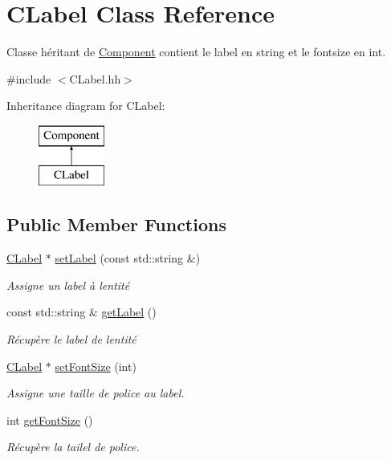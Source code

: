 \hypertarget{class_c_label}{}\section{C\+Label Class Reference}
\label{class_c_label}


Classe héritant de \hyperlink{class_component}{Component} contient le label en string et le fontsize en int.  




{\ttfamily \#include $<$C\+Label.\+hh$>$}

Inheritance diagram for C\+Label\+:\begin{figure}[H]
\begin{center}
\leavevmode
\includegraphics[height=2.000000cm]{class_c_label}
\end{center}
\end{figure}
\subsection*{Public Member Functions}
\begin{DoxyCompactItemize}
\item 
\hyperlink{class_c_label}{C\+Label} $\ast$ \hyperlink{class_c_label_a8b75f2c74e64b9a4453ab8adc839e16f}{set\+Label} (const std\+::string \&)
\begin{DoxyCompactList}\small\item\em Assigne un label à l\textquotesingle{}entité \end{DoxyCompactList}\item 
const std\+::string \& \hyperlink{class_c_label_a3bdb26bfcb7cf8801340e46240cbf2a5}{get\+Label} ()
\begin{DoxyCompactList}\small\item\em Récupère le label de l\textquotesingle{}entité \end{DoxyCompactList}\item 
\hyperlink{class_c_label}{C\+Label} $\ast$ \hyperlink{class_c_label_a69a80521075af5e41222038cf536af0f}{set\+Font\+Size} (int)
\begin{DoxyCompactList}\small\item\em Assigne une taille de police au label. \end{DoxyCompactList}\item 
int \hyperlink{class_c_label_a11d5ce9578dbd1fd8c88423f8da7617a}{get\+Font\+Size} ()
\begin{DoxyCompactList}\small\item\em Récupère la tailel de police. \end{DoxyCompactList}\end{DoxyCompactItemize}

